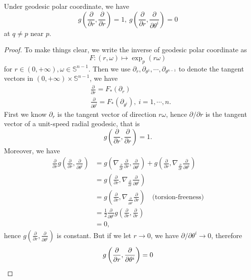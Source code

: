 \begin{prop}
    Under geodesic polar coordinate, we have
    \[g\left(\frac{\partial{}}{\partial{r}},\frac{\partial{}}{\partial{r}}\right)=1,\ g\left(\frac{\partial{}}{\partial{r}},\frac{\partial{}}{\partial{\theta^i}}\right)=0\]
    at $q\neq p$ near $p$.
\end{prop}
\begin{proof}
    To make things clear, we write the inverse of geodesic polar coordinate as
    \[F:(r,\omega)\mapsto\exp_p(r\omega)\]
    for $r\in(0,+\infty),\omega\in\mathbb{S}^{n-1}$.
    Then we use $\partial_r,\partial_{\theta^1},\cdots,\partial_{\theta^{n-1}}$ to denote the tangent vectors in $(0,+\infty)\times\mathbb{S}^{n-1}$, we have
    \begin{align*}
        &\frac{\partial{}}{\partial{r}}=F_*(\partial_r)\\
        &\frac{\partial{}}{\partial{\theta^i}}=F_*(\partial_{\theta^i}),\ i=1,\cdots,n.
    \end{align*}
    First we know $\partial_r$ is the tangent vector of direction $r\omega$, hence $\partial{}/\partial{r}$ is the tangent vector of a unit-speed radial geodesic, that is
    \[g\left(\frac{\partial{}}{\partial{r}},\frac{\partial{}}{\partial{r}}\right)=1.\]
    Moreover, we have
    \begin{align*}
        \frac{\partial{}}{\partial{r}}g\left(\frac{\partial{}}{\partial{r}},\frac{\partial{}}{\partial{\theta^i}}\right)&=g\left(\nabla_{\frac{\partial{}}{\partial{r}}}\frac{\partial{}}{\partial{r}},\frac{\partial{}}{\partial{\theta^i}}\right)+g\left(\frac{\partial{}}{\partial{r}},\nabla_{\frac{\partial{}}{\partial{r}}}\frac{\partial{}}{\partial{\theta^i}}\right)\\
        &=g\left(\frac{\partial{}}{\partial{r}},\nabla_{\frac{\partial{}}{\partial{r}}}\frac{\partial{}}{\partial{\theta^i}}\right)\\
        &=g\left(\frac{\partial{}}{\partial{r}},\nabla_{\frac{\partial{}}{\partial{\theta^i}}}\frac{\partial{}}{\partial{r}}\right)\quad\text{(torsion-freeness)}\\
        &=\frac{1}{2}\frac{\partial{}}{\partial{\theta^i}}g\left(\frac{\partial{}}{\partial{r}},\frac{\partial{}}{\partial{r}}\right)\\
        &=0,
    \end{align*}
    hence $g\left(\frac{\partial{}}{\partial{r}},\frac{\partial{}}{\partial{\theta^i}}\right)$ is constant.
    But if we let $r\to 0$, we have $\partial{}/\partial{\theta^i}\to 0$, therefore
    \[g\left(\frac{\partial{}}{\partial{r}},\frac{\partial{}}{\partial{\theta^i}}\right)=0\qedhere\]
\end{proof}

